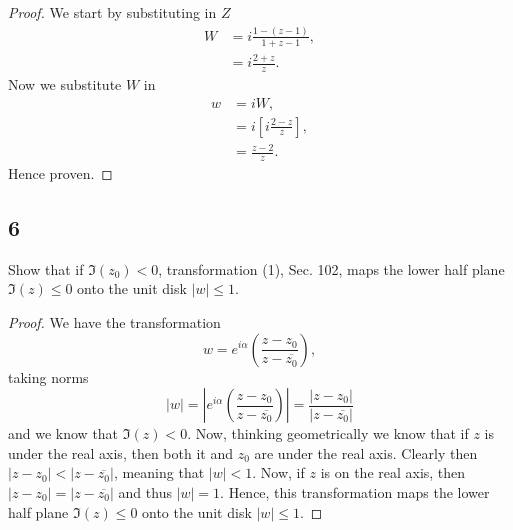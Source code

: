 \documentclass{article}
\begin{document}
\begin{proof}
    We start by substituting in $Z$
    \begin{align*}
        W & = i\frac{1-(z-1)}{1 + z-1}, \\
          & = i\frac{2 + z}{z}.
    \end{align*}
    Now we substitute $W$ in
    \begin{align*}
        w & = iW,                             \\
          & = i\left[i\frac{2 - z}{z}\right], \\
          & = \frac{z - 2}{z}.
    \end{align*}
    Hence proven.
\end{proof}

\subsection*{6}
Show that if $\Im(z_0) < 0$, transformation (1), Sec. 102, maps the lower half plane
$\Im(z) \leq 0$ onto the unit disk $|w| \leq 1$.

\begin{proof}
    We have the transformation
    \begin{equation*}
        w = e^{i\alpha}\left(\frac{z-z_0}{z-\overline{z_0}}\right),
    \end{equation*}
    taking norms
    \begin{equation*}
        |w| = \left|e^{i\alpha}\left(\frac{z-z_0}{z-\overline{z_0}}\right)\right|
        =  \frac{|z-z_0|}{|z-\overline{z_0}|}
    \end{equation*}
    and we know that $\Im(z) < 0$. Now, thinking geometrically we know that if
    $z$ is under the real axis, then both it and $z_0$
    are under the real axis. Clearly then $|z - z_0| < |z - \overline{z_0}|$, meaning
    that $|w| < 1$. Now, if $z$ is on the real axis, then $|z - z_0| = |z - \overline{z_0}|$
    and thus $|w| = 1$. Hence, this transformation maps the lower half plane
    $\Im(z) \leq 0$ onto the unit disk $|w| \leq 1$.
\end{proof}
\end{document}
